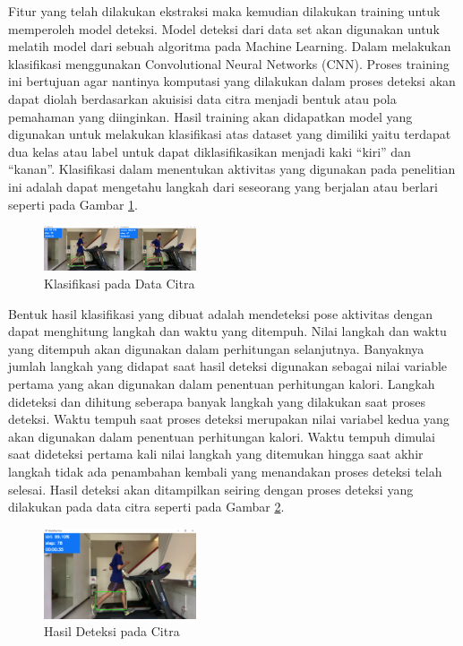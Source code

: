Fitur yang telah dilakukan ekstraksi maka kemudian dilakukan training untuk memperoleh model deteksi. Model deteksi dari data set akan digunakan untuk melatih model dari sebuah algoritma pada Machine Learning. Dalam melakukan klasifikasi menggunakan Convolutional Neural Networks (CNN). Proses training ini bertujuan agar nantinya komputasi yang dilakukan dalam proses deteksi akan dapat diolah berdasarkan akuisisi data citra menjadi bentuk atau pola pemahaman yang diinginkan. Hasil training akan didapatkan model yang digunakan untuk melakukan klasifikasi atas dataset yang dimiliki yaitu terdapat dua kelas atau label untuk dapat diklasifikasikan menjadi kaki “kiri” dan “kanan”. Klasifikasi dalam menentukan aktivitas yang digunakan pada penelitian ini adalah dapat mengetahu langkah dari seseorang yang berjalan atau berlari seperti pada Gambar \ref{fig:DeteksiModel}.

\begin{figure} [ht]
  \centering
  \includegraphics[width=0.4\textwidth]{gambar/deteksi.png}
  \caption{Klasifikasi pada Data Citra}
  \label{fig:DeteksiModel}
\end{figure}


Bentuk hasil klasifikasi yang dibuat adalah mendeteksi pose aktivitas dengan dapat menghitung langkah dan waktu yang ditempuh. Nilai langkah dan waktu yang ditempuh akan digunakan dalam perhitungan selanjutnya. Banyaknya jumlah langkah yang didapat saat hasil deteksi digunakan sebagai nilai variable pertama yang akan digunakan dalam penentuan perhitungan kalori. Langkah dideteksi dan dihitung seberapa banyak langkah yang dilakukan saat proses deteksi. Waktu tempuh saat proses deteksi merupakan nilai variabel kedua yang akan digunakan dalam penentuan perhitungan kalori. Waktu tempuh dimulai saat dideteksi pertama kali nilai langkah yang ditemukan hingga saat akhir langkah tidak ada penambahan kembali yang menandakan proses deteksi telah selesai. Hasil deteksi akan ditampilkan seiring dengan proses deteksi yang dilakukan pada data citra seperti pada Gambar \ref{fig:HasilDeteksi}.

\begin{figure} [ht]
  \centering
  \includegraphics[width=0.4\textwidth]{gambar/hasil deteksi.png}
  \caption{Hasil Deteksi pada Citra}
  \label{fig:HasilDeteksi}
\end{figure}

